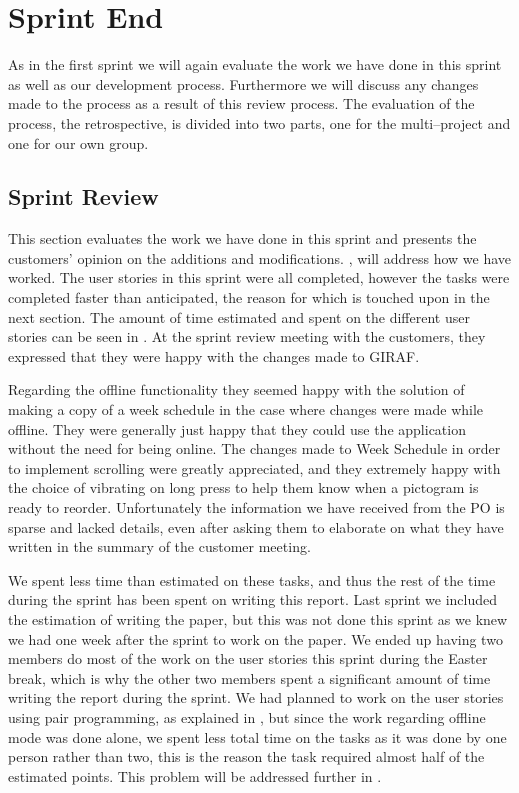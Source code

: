 \chapter{Sprint End}
As in the first sprint we will again evaluate the work we have done in this sprint as well as our development process.
Furthermore we will discuss any changes made to the process as a result of this review process.
The evaluation of the process, the retrospective, is divided into two parts, one for the multi--project and one for our own group.

\section{Sprint Review}
This section evaluates the work we have done in this sprint and presents the customers' opinion on the additions and modifications.
, will address how we have worked.
The user stories in this sprint were all completed, however the tasks were completed faster than anticipated, the reason for which is touched upon in the next section.
The amount of time estimated and spent on the different user stories can be seen in .
At the sprint review meeting with the customers, they expressed that they were happy with the changes made to GIRAF.

Regarding the offline functionality they seemed happy with the solution of making a copy of a week schedule in the case where changes were made while offline.
They were generally just happy that they could use the application without the need for being online.
The changes made to Week Schedule in order to implement scrolling were greatly appreciated, and they extremely happy with the choice of vibrating on long press to help them know when a pictogram is ready to reorder.
Unfortunately the information we have received from the PO is sparse and lacked details, even after asking them to elaborate on what they have written in the summary of the customer meeting.

We spent less time than estimated on these tasks, and thus the rest of the time during the sprint has been spent on writing this report.
Last sprint we included the estimation of writing the paper, but this was not done this sprint as we knew we had one week after the sprint to work on the paper.
We ended up having two members do most of the work on the user stories this sprint during the Easter break, which is why the other two members spent a significant amount of time writing the report during the sprint.
We had planned to work on the user stories using pair programming, as explained in , but since the work regarding offline mode was done alone, we spent less total time on the tasks as it was done by one person rather than two, this is the reason the task required almost half of the estimated points.
This problem will be addressed further in .

